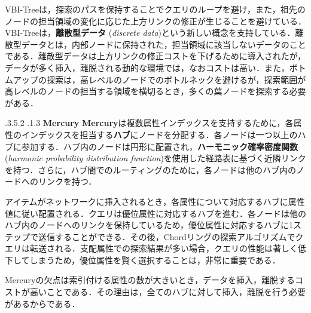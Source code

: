 \documentclass{jarticle}
\makeatletter
\renewcommand{\subsubsection}{\@startsection{subsubsection}{3}{\z@}%
   {.3\Cvs \@plus.5\Cvs \@minus.2\Cvs}%
   {.1\Cvs \@plus.3\Cvs}%
   {\reset@font\normalsize\bfseries}}
\makeatother
\begin{document}
{VBI-Treeは，探索のパスを保持することでクエリのループを避け，また，祖先のノードの担当領域の変化に応じた上方リンクの修正が生じることを避けている．VBI-Treeは，\textbf{離散型データ} (\textit{discrete data})という新しい概念を支持している．離散型データとは，内部ノードに保持された，担当領域に該当しないデータのことである．離散型データは上方リンクの修正コストを下げるために導入されたが，データが多く挿入，離脱される動的な環境では，なおコストは高い．また，ボトムアップの探索は，高レベルのノードでのボトルネックを避けるが，探索範囲が高レベルのノードの担当する領域を横切るとき，多くの葉ノードを探索する必要がある．



\subsubsection{\textbf{Mercury}}
\textbf{Mercury}は複数属性インデックスを支持するために，各属性のインデックスを担当する\textbf{ハブ}にノードを分配する．各ノードは一つ以上のハブに参加する．ハブ内のノードは円形に配置され，\textbf{ハーモニック確率密度関数} (\textit{harmonic probability distribution function})を使用した経路表に基づく近隣リンクを持つ．さらに，ハブ間でのルーティングのために，各ノードは他のハブ内のノードへのリンクを持つ．

アイテムがネットワークに挿入されるとき，各属性について対応するハブに属性値に従い配置される．クエリは優位属性に対応するハブを進む．各ノードは他のハブ内のノードへのリンクを保持しているため，優位属性に対応するハブに1ステップで送信することができる．その後，Chordリングの探索アルゴリズムでクエリは転送される．支配属性での探索結果が多い場合，クエリの性能は著しく低下してしまうため，優位属性を賢く選択することは，非常に重要である．

Mercuryの欠点は索引付ける属性の数が大きいとき，データを挿入，離脱するコストが高いことである．その理由は，全てのハブに対して挿入，離脱を行う必要があるからである．


}
\end{document}

